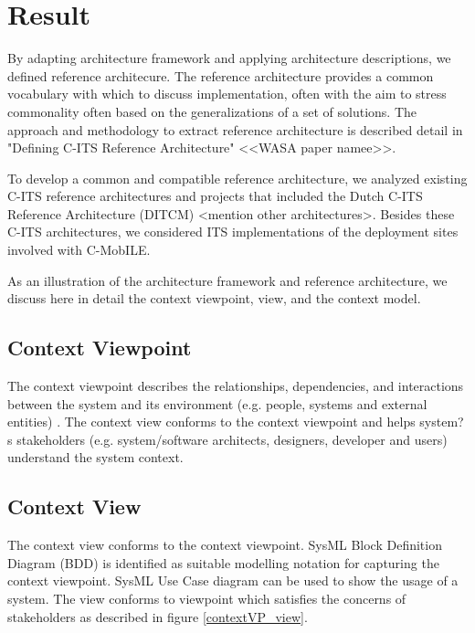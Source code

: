 \documentclass[letterpaper, 10 pt, conference]{ieeeconf}  %
\begin{document}
\section{Result}

By adapting architecture framework and applying architecture descriptions, we defined reference architecure. The reference architecture provides a common vocabulary with which to discuss implementation, often with the aim to stress commonality often based on the generalizations of a set of solutions. The approach and methodology to extract reference architecture is described detail in "Defining C-ITS Reference Architecture" \cite{d31} <<WASA paper namee>>.

To develop a common and compatible reference architecture, we analyzed existing C-ITS reference architectures and projects that included the Dutch C-ITS Reference Architecture (DITCM) \cite{dtcim} <mention other architectures>. Besides these C-ITS architectures, we considered ITS implementations of the deployment sites involved with C-MobILE.

As an illustration of the architecture framework and reference architecture, we discuss here in detail the context viewpoint, view, and the context model.


\subsection{Context Viewpoint}

The context viewpoint describes the relationships, dependencies, and interactions between the system and its environment (e.g. people, systems and external entities) \cite{woods}. The context view conforms to the context viewpoint and helps system?s stakeholders (e.g. system/software architects, designers, developer and users) understand the system context.

\subsection{Context View}

The context view conforms to the context viewpoint. SysML Block Definition Diagram (BDD) is identified as suitable modelling notation for capturing the context viewpoint. SysML Use Case diagram can be used to show the usage of a system. The view conforms to viewpoint which satisfies the concerns of stakeholders as described in figure \ref{contextVP_view}.
\end{document}
